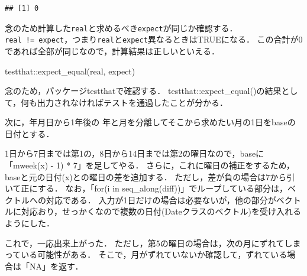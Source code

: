 \documentclass[
]{article}
\newenvironment{Shaded}{\begin{snugshade}}{\end{snugshade}}
\newcommand{\FunctionTok}[1]{\textcolor[rgb]{0.00,0.00,0.00}{#1}}
\newcommand{\NormalTok}[1]{#1}
\newcommand{\SpecialCharTok}[1]{\textcolor[rgb]{0.00,0.00,0.00}{#1}}
\begin{document}
\begin{verbatim}
## [1] 0
\end{verbatim}

念のため計算した\texttt{real}と求めるべき\texttt{expect}が同じか確認する．
\texttt{real\ !=\ expect}，つまり\texttt{real}と\texttt{expect}異なるときはTRUEになる．
この合計が0であれば全部が同じなので，計算結果は正しいといえる．

\begin{Shaded}
\begin{Highlighting}[]
\NormalTok{testthat}\SpecialCharTok{::}\FunctionTok{expect\_equal}\NormalTok{(real, expect)}
\end{Highlighting}
\end{Shaded}

念のため，パッケージtestthatで確認する．
testthat::expect\_equal()の結果として，何も出力されなければテストを通過したことが分かる．

次に，年月日から1年後の
年と月を分離してそこから求めたい月の1日をbaseの日付とする．

1日から7日までは第1の，8日から14日までは第2の曜日なので，baseに「mweek(x) - 1) * 7」を足してやる．
さらに，これに曜日の補正をするため，baseと元の日付(x)との曜日の差を追加する．
ただし，差が負の場合は7から引いて正にする．
なお，「for(i in seq\_along(diff))」でループしている部分は，ベクトルへの対応である．
入力が1日だけの場合は必要ないが，他の部分がベクトルに対応おり，せっかくなので複数の日付(Dateクラスのベクトル)を受け入れるようにした．

これで，一応出来上がった．
ただし，第5の曜日の場合は，次の月にずれてしまっている可能性がある．
そこで，月がずれていないか確認して，ずれている場合は「NA」を返す．
\end{document}
